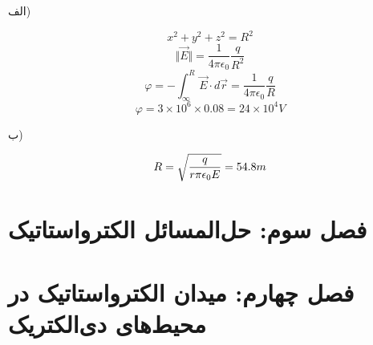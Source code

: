 \documentclass[11pt]{book}
\begin{document}
\subsection{}
الف)

\[ x^2 + y^2 + z^2 = R^2 \]
\[ \Vert \vec{E}\Vert = \frac{1}{4\pi \epsilon_0} \frac{q}{R^2} \]
\[ \varphi = -\int_{\infty}^{R} \vec{E} \cdot d\vec{r} = \frac{1}{4\pi \epsilon_0} \frac{q}{R} \]
\[ \varphi = 3 \times 10^6 \times 0.08 = 24 \times 10^4 V \]

ب)

\[ R = \sqrt{\frac{q}{r\pi \epsilon_0 E}} = 54.8 \\ m \]
\section{فصل سوم: حل‌المسائل الکترواستاتیک}

\section{فصل چهارم: میدان الکترواستاتیک در محیط‌های دی‌الکتریک}
\end{document}
